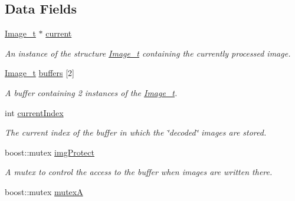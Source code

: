 \subsection*{Data Fields}
\begin{DoxyCompactItemize}
\item 
\hypertarget{classfindPersonStream_ae8b515cceb310a575b6c2677ba93ea7e}{
\hyperlink{structImage__t}{Image\_\-t} $\ast$ \hyperlink{classfindPersonStream_ae8b515cceb310a575b6c2677ba93ea7e}{current}}
\label{classfindPersonStream_ae8b515cceb310a575b6c2677ba93ea7e}

\begin{DoxyCompactList}\small\item\em An instance of the structure {\ttfamily \hyperlink{structImage__t}{Image\_\-t}} containing the currently processed image. \item\end{DoxyCompactList}\item 
\hypertarget{classfindPersonStream_a74991cfaebd95fe07277e343f45a8ee5}{
\hyperlink{structImage__t}{Image\_\-t} \hyperlink{classfindPersonStream_a74991cfaebd95fe07277e343f45a8ee5}{buffers} \mbox{[}2\mbox{]}}
\label{classfindPersonStream_a74991cfaebd95fe07277e343f45a8ee5}

\begin{DoxyCompactList}\small\item\em A buffer containing 2 instances of the {\ttfamily \hyperlink{structImage__t}{Image\_\-t}}. \item\end{DoxyCompactList}\item 
\hypertarget{classfindPersonStream_a8bc98f0867f04d66bd76205fa7c9efad}{
int \hyperlink{classfindPersonStream_a8bc98f0867f04d66bd76205fa7c9efad}{currentIndex}}
\label{classfindPersonStream_a8bc98f0867f04d66bd76205fa7c9efad}

\begin{DoxyCompactList}\small\item\em The current index of the buffer in which the \char`\"{}decoded\char`\"{} images are stored. \item\end{DoxyCompactList}\item 
\hypertarget{classfindPersonStream_a3766834d17306ee096a69ab07c430d8f}{
boost::mutex \hyperlink{classfindPersonStream_a3766834d17306ee096a69ab07c430d8f}{imgProtect}}
\label{classfindPersonStream_a3766834d17306ee096a69ab07c430d8f}

\begin{DoxyCompactList}\small\item\em A mutex to control the access to the buffer when images are written there. \item\end{DoxyCompactList}\item 
\hypertarget{classfindPersonStream_ac826e3afc1d969f6b91917397d161cc3}{
boost::mutex \hyperlink{classfindPersonStream_ac826e3afc1d969f6b91917397d161cc3}{mutexA}}
\label{classfindPersonStream_ac826e3afc1d969f6b91917397d161cc3}


\end{DoxyCompactItemize}

